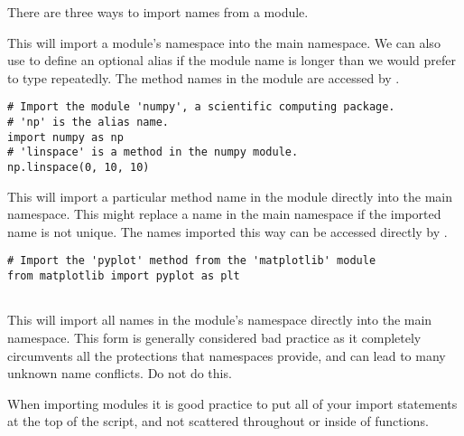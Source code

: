 There are three ways to import names from a module.
\begin{description}
\item {} This will import a module's namespace into the main namespace.
We can also use  to define an optional alias if the module name is longer than we would prefer to type repeatedly.
The method names in the module are accessed by .
\begin{lstlisting}
# Import the module 'numpy', a scientific computing package.
# 'np' is the alias name.
import numpy as np
# 'linspace' is a method in the numpy module.
np.linspace(0, 10, 10)
\end{lstlisting}

\item {} This will import a particular method name in the module directly into the main namespace.
This might replace a name in the main namespace if the imported name is not unique.
The names imported this way can be accessed directly by .

\begin{lstlisting}
# Import the 'pyplot' method from the 'matplotlib' module
from matplotlib import pyplot as plt


\end{lstlisting}
\item {} This will import all names in the module's namespace directly into the main namespace.
This form is generally considered bad practice as it completely circumvents all the protections that namespaces provide, and can lead to many unknown name conflicts. Do not do this.
\end{description}

When importing modules it is good practice to put all of your import statements at the top of the script, and not scattered throughout or inside of functions.

